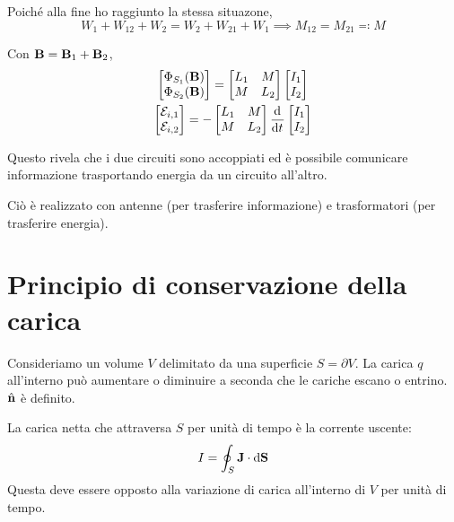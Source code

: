 Poiché alla fine ho raggiunto la stessa situazone,
\begin{equation}
    W_1 + W_{12} + W_2 = W_2 + W_{21} + W_1
    \implies
    M_{12} = M_{21} \eqcolon M
\end{equation}

Con $\mathbf{B} = \mathbf{B}_1 + \mathbf{B}_2$,
\begin{subequations}
\begin{gather}
    \begin{bmatrix} \Phi_{S_1}(\B) \\ \Phi_{S_2}(\B) \end{bmatrix} =
    \begin{bmatrix}
        L_1 & M \\ M & L_2
    \end{bmatrix}
    \begin{bmatrix} I_1 \\ I_2 \end{bmatrix}
    \\
    \begin{bmatrix} \fem_{i,1} \\ \fem_{i,2} \end{bmatrix} =
    - \begin{bmatrix}
        L_1 & M \\ M & L_2
    \end{bmatrix}
    \der{t} \begin{bmatrix} I_1 \\ I_2 \end{bmatrix}
\end{gather}
\end{subequations}

Questo rivela che i due circuiti sono accoppiati ed è possibile comunicare informazione trasportando energia da un circuito all'altro.

Ciò è realizzato con antenne (per trasferire informazione) e trasformatori (per trasferire energia).


\section{Principio di conservazione della carica}

Consideriamo un volume $V$ delimitato da una superficie $S = \partial V$.
La carica $q$ all'interno può aumentare o diminuire a seconda che le cariche escano o entrino.
$\hat{\mathbf{n}}$ è definito.

La carica netta che attraversa $S$ per unità di tempo è la corrente uscente:
\begin{equation}
    I = \oint_S \mathbf{J} \cdot \mathrm{d} \mathbf{S}
\end{equation}
Questa deve essere opposto alla variazione di carica all'interno di $V$ per unità di tempo.

